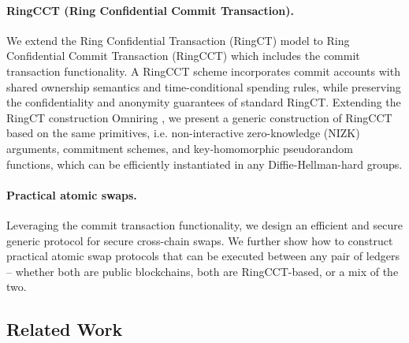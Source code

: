 \paragraph*{RingCCT (Ring Confidential Commit Transaction).} We extend the Ring Confidential Transaction (RingCT) model to Ring Confidential Commit Transaction (RingCCT) which includes the commit transaction functionality. A RingCCT scheme incorporates commit accounts with shared ownership semantics and time-conditional spending rules, while preserving the confidentiality and anonymity guarantees of standard RingCT. Extending the RingCT construction Omniring \cite{CCS:LRRSTW19}, we present a generic construction of RingCCT based on the same primitives, i.e. non-interactive zero-knowledge (NIZK) arguments, commitment schemes, and key-homomorphic pseudorandom functions, which can be efficiently instantiated in any Diffie-Hellman-hard groups. 

\paragraph*{Practical atomic swaps.} 
Leveraging the commit transaction functionality, we design an efficient and secure generic protocol for secure cross-chain swaps. We further show how to construct practical atomic swap protocols that can be executed between any pair of ledgers -- whether both are public blockchains, both are RingCCT-based, or a mix of the two.


\subsection{Related Work}
